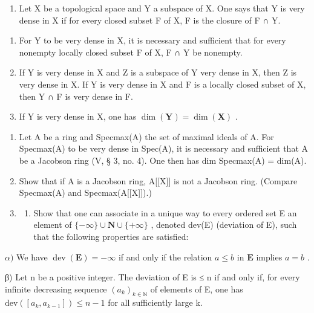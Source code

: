 
\begin{enumerate}
\def\labelenumi{\arabic{enumi})}
\tightlist
\item
  Let X be a topological space and Y a subspace of X. One says that Y is very dense in X if for every closed subset F of X, F is the closure of F ∩ Y.
\end{enumerate}

\begin{enumerate}
\def\labelenumi{\alph{enumi})}
\item
  For Y to be very dense in X, it is necessary and sufficient that for every nonempty locally closed subset F of X, F ∩ Y be nonempty.
\item
  If Y is very dense in X and Z is a subspace of Y very dense in X, then Z is very dense in X. If Y is very dense in X and F is a locally closed subset of X, then Y ∩ F is very dense in F.
\item
  If Y is very dense in X, one has \(\dim(\mathbf{Y}) = \dim(\mathbf{X})\) .
\end{enumerate}

\begin{enumerate}
\def\labelenumi{\arabic{enumi})}
\setcounter{enumi}{1}
\item
  Let A be a ring and Specmax(A) the set of maximal ideals of A. For Specmax(A) to be very dense in Spec(A), it is necessary and sufficient that A be a Jacobson ring (V, § 3, no. 4). One then has dim Specmax(A) = dim(A).
\item
  Show that if A is a Jacobson ring, A{[}{[}X{]}{]} is not a Jacobson ring. (Compare Specmax(A) and Specmax(A{[}{[}X{]}{]}).)
\item
  \begin{enumerate}
  \def\labelenumii{\alph{enumii})}
  \tightlist
  \item
    Show that one can associate in a unique way to every ordered set E an element of \(\{-\infty\}\cup\mathbf{N}\cup\{+\infty\}\) , denoted dev(E) (deviation of E), such that the following properties are satisfied:
  \end{enumerate}
\end{enumerate}

\(\alpha)\) We have \(\operatorname{dev}(\mathbf{E}) = -\infty\) if and only if the relation \(a \leqslant b\) in \(\mathbf{E}\) implies \(a = b\) .

β) Let n be a positive integer. The deviation of E is ≤ n if and only if, for every infinite decreasing sequence \((a_{k})_{k\in\mathbb{N}}\) of elements of E, one has \(\text{dev}([a_{k}, a_{k-1}]) \leqslant n - 1\) for all sufficiently large k.

